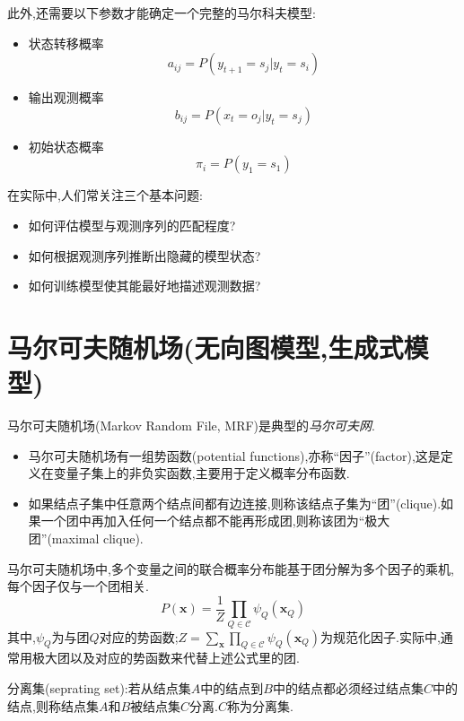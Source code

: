 此外,还需要以下参数才能确定一个完整的马尔科夫模型:
\begin{itemize}
\item 状态转移概率
\begin{equation}
a_{ij}=P(y_{t+1}=s_j|y_t=s_i)
\end{equation}
\item 输出观测概率
\begin{equation}
b_{ij}=P(x_t=o_j|y_t=s_j)
\end{equation}
\item 初始状态概率
\begin{equation}
\pi_i=P(y_1=s_1)
\end{equation}
\end{itemize}

在实际中,人们常关注三个基本问题:
\begin{itemize}
\item 如何评估模型与观测序列的匹配程度?
\item 如何根据观测序列推断出隐藏的模型状态?
\item 如何训练模型使其能最好地描述观测数据?
\end{itemize}

\section{马尔可夫随机场(无向图模型,生成式模型)}

马尔可夫随机场(Markov Random File, MRF)是典型的\textit{马尔可夫网}.
\begin{itemize}
\item 马尔可夫随机场有一组势函数(potential functions),亦称``因子''(factor),这是定义在变量子集上的非负实函数,主要用于定义概率分布函数.
\item 如果结点子集中任意两个结点间都有边连接,则称该结点子集为``团''(clique).如果一个团中再加入任何一个结点都不能再形成团,则称该团为``极大团''(maximal clique).
\end{itemize}

马尔可夫随机场中,多个变量之间的联合概率分布能基于团分解为多个因子的乘机,每个因子仅与一个团相关.
\begin{equation}
P(\bm x)=\frac{1}{Z}\prod_{Q\in\mathcal C}\psi_Q(\bm x_Q)
\end{equation}
其中,$\psi_Q$为与团$Q$对应的势函数;$Z=\sum_{\bm x}\prod_{Q\in\mathcal C}\psi_Q(\bm x_Q)$为规范化因子.实际中,通常用极大团以及对应的势函数来代替上述公式里的团.

分离集(seprating set):若从结点集$A$中的结点到$B$中的结点都必须经过结点集$C$中的结点,则称结点集$A$和$B$被结点集$C$分离.$C$称为分离集.


